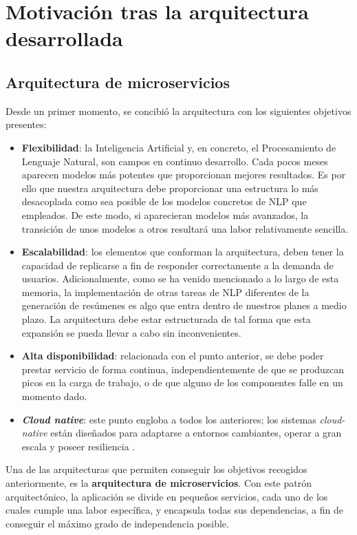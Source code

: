\section{Motivación tras la arquitectura desarrollada}

\subsection{Arquitectura de microservicios}

Desde un primer momento, se concibió la arquitectura con los siguientes objetivos presentes:

\vspace{-0.5cm}
\begin{itemize}
	\item [\textbullet] \textbf{Flexibilidad}: la Inteligencia Artificial y, en concreto, el Procesamiento de Lenguaje Natural, son campos en continuo desarrollo. Cada pocos meses aparecen modelos más potentes que proporcionan mejores resultados. Es por ello que nuestra arquitectura debe proporcionar una estructura lo más desacoplada como sea posible de los modelos concretos de NLP que empleados. De este modo, si aparecieran modelos más avanzados, la transición de unos modelos a otros resultará una labor relativamente sencilla.
	\item [\textbullet] \textbf{Escalabilidad}: los elementos que conforman la arquitectura, deben tener la capacidad de replicarse a fin de responder correctamente a la demanda de usuarios. Adicionalmente, como se ha venido mencionado a lo largo de esta memoria, la implementación de otras tareas de NLP diferentes de la generación de resúmenes es algo que entra dentro de nuestros planes a medio plazo. La arquitectura debe estar estructurada de tal forma que esta expansión se pueda llevar a cabo sin inconvenientes. 
	\item [\textbullet] \textbf{Alta disponibilidad}: relacionada con el punto anterior, se debe poder prestar servicio de forma continua, independientemente de que se produzcan picos en la carga de trabajo, o de que alguno de los componentes falle en un momento dado.
	\item [\textbullet] \textbf{\emph{Cloud native}}: este punto engloba a todos los anteriores; los sistemas \emph{cloud-native} están diseñados para adaptarse a entornos cambiantes, operar a gran escala y poseer resiliencia \cite{cloud20}.
\end{itemize}

Una de las arquitecturas que permiten conseguir los objetivos recogidos anteriormente, es la \textbf{arquitectura de microservicios}. Con este patrón arquitectónico, la aplicación se divide en pequeños servicios, cada uno de los cuales cumple una labor específica, y encapsula todas sus dependencias, a fin de conseguir el máximo grado de independencia posible.

